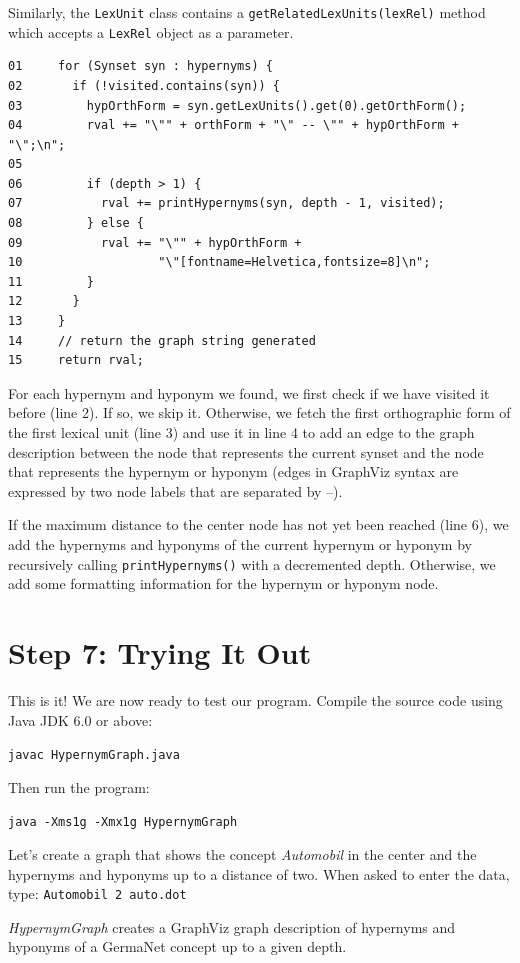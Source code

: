 \documentclass[12pt,a4paper,english,utf8]{report}
\begin{document}
Similarly, the \texttt{LexUnit} class contains a \texttt{getRelatedLexUnits(lexRel)} method which accepts a \texttt{LexRel} object as a parameter.

\begin{lstlisting}
01     for (Synset syn : hypernyms) { 
02       if (!visited.contains(syn)) { 
03         hypOrthForm = syn.getLexUnits().get(0).getOrthForm(); 
04         rval += "\"" + orthForm + "\" -- \"" + hypOrthForm + "\";\n"; 
05 
06         if (depth > 1) { 
07           rval += printHypernyms(syn, depth - 1, visited); 
08         } else { 
09           rval += "\"" + hypOrthForm + 
10                   "\"[fontname=Helvetica,fontsize=8]\n"; 
11         } 
12       } 
13     } 
14     // return the graph string generated 
15     return rval;
\end{lstlisting}

For each hypernym and hyponym we found, we first check if we have visited it before (line 2). If so, we skip it. Otherwise, we fetch the first orthographic form of the first lexical unit (line 3) and use it in line 4 to add an edge to the graph description between the node that represents the current synset and the node that represents the hypernym or hyponym (edges in GraphViz syntax are expressed by two node labels that are separated by --).

If the maximum distance to the center node has not yet been reached (line 6), we add the hypernyms and hyponyms of the current hypernym or hyponym by recursively calling \texttt{printHypernyms()} with a decremented depth. Otherwise, we add some formatting information for the hypernym or hyponym node.



\section{Step 7: Trying It Out}
\label{tutorialEnds}
This is it! We are now ready to test our program. Compile the source code using Java JDK 6.0 or above:

\texttt{javac HypernymGraph.java}

Then run the program:

\texttt{java -Xms1g -Xmx1g HypernymGraph}

Let's create a graph that shows the concept \emph{Automobil} in the center and the hypernyms and hyponyms up to a distance of two. When asked to enter the data, type: \texttt{Automobil 2 auto.dot}

\emph{HypernymGraph} creates a GraphViz graph description of hypernyms and hyponyms of a GermaNet concept up to a given depth.
\end{document}

